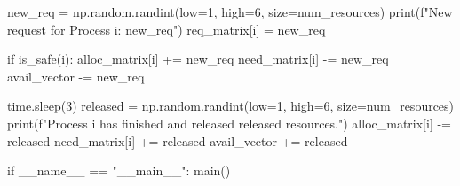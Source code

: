\begin{python}
        new_req = np.random.randint(low=1, high=6, size=num_resources)
        print(f"New request for Process {i}: {new_req}")
        req_matrix[i] = new_req

        if is_safe(i):
            alloc_matrix[i] += new_req
            need_matrix[i] -= new_req
            avail_vector -= new_req

        time.sleep(3)
        released = np.random.randint(low=1, high=6, size=num_resources)
        print(f"Process {i} has finished and released {released} resources.")
        alloc_matrix[i] -= released
        need_matrix[i] += released
        avail_vector += released

if __name__ == "__main__":
    main()
\end{python}

